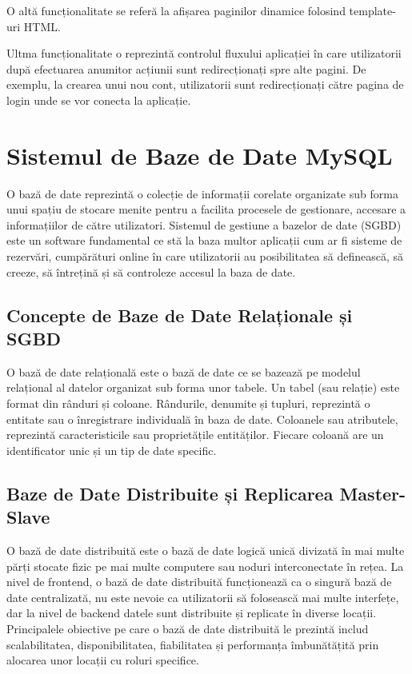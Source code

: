 \documentclass[12pt, a4paper, oneside, romanian]{teza-upb}
\begin{document}
	O altă funcționalitate se referă la afișarea paginilor dinamice folosind template-uri HTML.
	
	Ultma funcționalitate o reprezintă controlul fluxului aplicației în care utilizatorii după efectuarea anumitor acțiunii sunt redirecționați spre alte pagini. De exemplu, la crearea unui nou cont, utilizatorii sunt redirecționați către pagina de login unde se vor conecta la aplicație.
	
	\section{Sistemul de Baze de Date MySQL}
	
	
	O bază de date reprezintă \cite{bdd} o colecție de informații corelate organizate sub forma unui spațiu de stocare menite pentru a facilita procesele de gestionare, accesare a informațiilor de către utilizatori. Sistemul de gestiune a bazelor de date (SGBD) este un software fundamental ce stă la baza multor aplicații cum ar fi sisteme de rezervări, cumpărături online în care utilizatorii au posibilitatea să definească, să creeze, să întrețină și să controleze accesul la baza de date. 
	
	\subsection*{Concepte de Baze de Date Relaționale și SGBD}
	O bază de date relațională este o bază de date ce se bazează pe modelul relațional al datelor organizat sub forma unor tabele. Un tabel (sau relație) este format din rânduri și coloane. Rândurile, denumite și tupluri, reprezintă o entitate sau o înregistrare individuală în baza de date. Coloanele sau atributele, reprezintă caracteristicile sau proprietățile entităților. Fiecare coloană are un identificator unic și un tip de date specific.
	
	\subsection*{Baze de Date Distribuite și Replicarea Master-Slave}
	
	O bază de date distribuită este o bază de date logică unică divizată în mai multe părți stocate fizic pe mai multe computere sau noduri interconectate în rețea. La nivel de frontend, o bază de date distribuită funcționează ca o singură bază de date centralizată, nu este nevoie ca utilizatorii să folosească mai multe interfețe, dar la nivel de backend datele sunt distribuite și replicate în diverse locații. Principalele obiective pe care o bază de date distribuită le prezintă includ scalabilitatea, disponibilitatea, fiabilitatea și performanța îmbunătățită prin alocarea unor locații cu roluri specifice.
	
\end{document}
